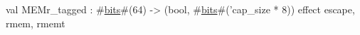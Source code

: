 val MEMr_tagged : #\hyperref[zbits]{bits}#(64) -> (bool, #\hyperref[zbits]{bits}#('cap_size * 8)) effect { escape, rmem, rmemt }
